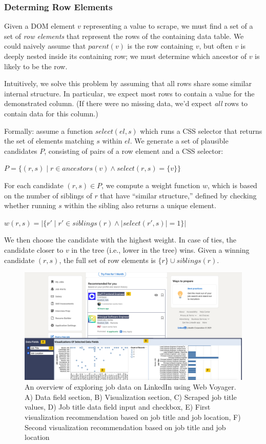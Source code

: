 \documentclass{vgtc}                          %
\begin{document}
\subsubsection{Determing Row Elements}

Given a DOM element \(v\) representing a value to scrape, we must find a
set of a set of \emph{row elements} that represent the rows of the
containing data table. We could naively assume that \(parent(v)\) is the
row containing \(v\), but often \(v\) is deeply nested inside its
containing row; we must determine which ancestor of \(v\) is likely to
be the row.

Intuitively, we solve this problem by assuming that all rows share some
similar internal structure. In particular, we expect most rows to
contain a value for the demonstrated column. (If there were no missing
data, we'd expect \emph{all} rows to contain data for this column.)

Formally: assume a function \(select(el, s)\) which runs a CSS selector
that returns the set of elements matching \(s\) within \(el\). We
generate a set of plausible candidates \(P\), consisting of pairs of a
row element and a CSS selector:

\(P = \{ (r, s) \mid r \in ancestors(v) \land select(r, s) = \{v\} \}\)

For each candidate \((r, s) \in P\), we compute a weight function \(w\),
which is based on the number of siblings of \(r\) that have ``similar
structure,'' defined by checking whether running \(s\) within the
sibling also returns a unique element.

\(w(r, s) = |\{ r' \mid r' \in siblings(r) \land |select(r', s) | = 1 \}|\)

We then choose the candidate with the highest weight. In case of ties,
the candidate closer to \(v\) in the tree (i.e., lower in the tree)
wins. Given a winning candidate \((r, s)\), the full set of row elements
is \(\{r\} \cup siblings(r)\).

\begin{figure}
  \includegraphics[width=\textwidth]{figures/example}
  \caption{\label{fig:example}An overview of exploring job data on LinkedIn using Web Voyager. A) Data field section, B) Visualization section, C) Scraped job title values, D) Job title data field input and checkbox, E) First visualization recommendation based on job title and job location, F) Second visualization recommendation based on job title and job location}
  \label{fig:example}
\end{figure}
\end{document}
